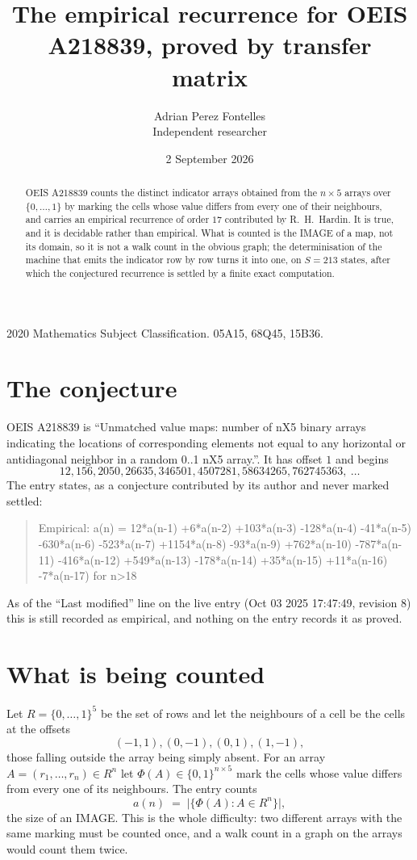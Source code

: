 \documentclass[11pt,a4paper]{article}
\title{The empirical recurrence for OEIS A218839, proved by transfer matrix}
\author{Adrian Perez Fontelles\\ \small Independent researcher}
\date{2 September 2026}
\theoremstyle{plain}
\theoremstyle{definition}
\begin{document}
\maketitle

\begin{abstract}
OEIS A218839 counts the distinct indicator arrays obtained from the $n\times5$ arrays over
$\{0,\dots,1\}$ by marking the cells whose value differs from every one of their neighbours, and carries an
empirical recurrence of order $17$ contributed by R.~H.~Hardin. It is true, and it is
decidable rather than empirical. What is counted is the IMAGE of a map, not its domain, so it
is not a walk count in the obvious graph; the determinisation of the machine that emits the
indicator row by row turns it into one, on $S=213$ states, after which the conjectured
recurrence is settled by a finite exact computation.
\end{abstract}

\noindent\small 2020 Mathematics Subject Classification. 05A15, 68Q45, 15B36.\normalsize

\section{The conjecture}

OEIS A218839 is ``Unmatched value maps: number of nX5 binary arrays indicating the locations of corresponding elements not equal to any horizontal or antidiagonal neighbor in a random 0..1 nX5 array.''. It has offset $1$ and begins
\[
12, 156, 2050, 26635, 346501, 4507281, 58634265, 762745363,\ \dots
\]
The entry states, as a conjecture contributed by its author and never marked settled:
\begin{quote}
Empirical: a(n) = 12*a(n-1) +6*a(n-2) +103*a(n-3) -128*a(n-4) -41*a(n-5) -630*a(n-6) -523*a(n-7) +1154*a(n-8) -93*a(n-9) +762*a(n-10) -787*a(n-11) -416*a(n-12) +549*a(n-13) -178*a(n-14) +35*a(n-15) +11*a(n-16) -7*a(n-17) for n>18
\end{quote}
As of the ``Last modified'' line on the live entry (Oct 03 2025 17:47:49, revision 8) this is still
recorded as empirical, and nothing on the entry records it as proved.

\section{What is being counted}

Let $R=\{0,\dots,1\}^{5}$ be the set of rows and let the neighbours of a cell be the
cells at the offsets
\[
(-1,1), (0,-1), (0,1), (1,-1),
\]
those falling outside the array being simply absent. For an array
$A=(r_1,\dots,r_n)\in R^n$ let $\Phi(A)\in\{0,1\}^{n\times5}$ mark the cells whose value
differs from every one of its neighbours. The entry counts
\[
a(n)\;=\;\bigl|\{\Phi(A):A\in R^n\}\bigr| ,
\]
the size of an IMAGE. This is the whole difficulty: two different arrays with the same marking
must be counted once, and a walk count in a graph on the arrays would count them twice.
\end{document}
